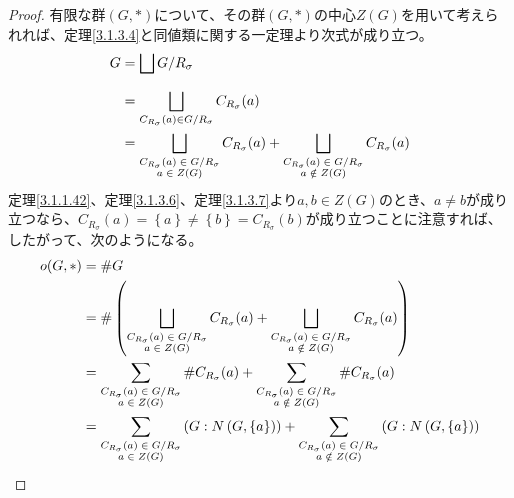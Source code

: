 \documentclass[dvipdfmx]{jsarticle}
\begin{document}
\begin{proof}
有限な群$(G,*)$について、その群$(G,*)$の中心$Z(G)$を用いて考えられれば、定理\ref{3.1.3.4}と同値類に関する一定理より次式が成り立つ。
\begin{align*}
G &= \bigsqcup_{} {G}/{R_{\sigma}}\\
&= \bigsqcup_{C_{R_{\sigma}}(a) \in {G}/{R_{\sigma}}} {C_{R_{\sigma}}(a)}\\
&= \bigsqcup_{\scriptsize \begin{matrix} C_{R_{\sigma}}(a) \in {G}/{R_{\sigma}} \\a \in Z(G) \end{matrix}} {C_{R_{\sigma}}(a)} + \bigsqcup_{\scriptsize \begin{matrix} C_{R_{\sigma}}(a) \in {G}/{R_{\sigma}} \\a \notin Z(G) \end{matrix}} {C_{R_{\sigma}}(a)}
\end{align*}
定理\ref{3.1.1.42}、定理\ref{3.1.3.6}、定理\ref{3.1.3.7}より$a,b \in Z(G)$のとき、$a \neq b$が成り立つなら、$C_{R_{\sigma}}(a) = \left\{ a \right\} \neq \left\{ b \right\} = C_{R_{\sigma}}(b)$が成り立つことに注意すれば、したがって、次のようになる。
\begin{align*}
o(G,*) &= \#G\\
&= \#\left( \bigsqcup_{\scriptsize \begin{matrix} C_{R_{\sigma}}(a) \in {G}/{R_{\sigma}} \\a \in Z(G) \end{matrix}} {C_{R_{\sigma}}(a)} + \bigsqcup_{\scriptsize \begin{matrix} C_{R_{\sigma}}(a) \in {G}/{R_{\sigma}} \\a \notin Z(G) \end{matrix}} {C_{R_{\sigma}}(a)} \right)\\
&= \sum_{\scriptsize \begin{matrix} C_{R_{\sigma}}(a) \in {G}/{R_{\sigma}} \\a \in Z(G) \end{matrix}} {\#{C_{R_{\sigma}}(a)}} + \sum_{\scriptsize \begin{matrix} C_{R_{\sigma}}(a) \in {G}/{R_{\sigma}} \\a \notin Z(G) \end{matrix}} {\#{C_{R_{\sigma}}(a)}}\\
&= \sum_{\scriptsize \begin{matrix} C_{R_{\sigma}}(a) \in {G}/{R_{\sigma}} \\a \in Z(G) \end{matrix}} \left( G:N\left( G,\left\{ a \right\} \right) \right) + \sum_{\scriptsize \begin{matrix} C_{R_{\sigma}}(a) \in {G}/{R_{\sigma}} \\a \notin Z(G) \end{matrix}} \left( G:N\left( G,\left\{ a \right\} \right) \right)\\

\end{align*}
\end{proof}
\end{document}
